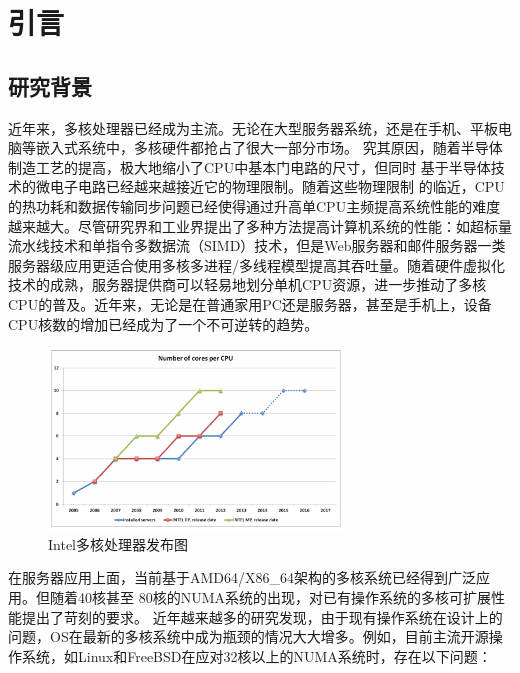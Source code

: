 

\chapter{引言}

\section{研究背景}

近年来，多核处理器已经成为主流。无论在大型服务器系统，还是在手机、平板电脑等嵌入式系统中，多核硬件都抢占了很大一部分市场。
究其原因，随着半导体制造工艺的提高，极大地缩小了CPU中基本门电路的尺寸，但同时
基于半导体技术的微电子电路已经越来越接近它的物理限制。随着这些物理限制
的临近，CPU的热功耗和数据传输同步问题已经使得通过升高单CPU主频提高系统性能的难度越来越大。尽管研究界和工业界提出了多种方法提高计算机系统的性能：如超标量流水线技术和单指令多数据流（SIMD）技术，但是Web服务器和邮件服务器一类服务器级应用更适合使用多核多进程/多线程模型提高其吞吐量。随着硬件虚拟化技术的成熟，服务器提供商可以轻易地划分单机CPU资源，进一步推动了多核CPU的普及。近年来，无论是在普通家用PC还是服务器，甚至是手机上，设备CPU核数的增加已经成为了一个不可逆转的趋势。

\begin{figure}[ht]
\begin{center}
\includegraphics[width=0.7\textwidth]{figures/intro_roadmap.png}
\end{center}
\caption{Intel多核处理器发布图\protect\footnotemark}
\label{fig:intro_roadmap}
\end{figure}
在服务器应用上面，当前基于AMD64/X86\_64架构的多核系统已经得到广泛应用。但随着40核甚至
80核的NUMA系统的出现，对已有操作系统的多核可扩展性能提出了苛刻的要求。
近年越来越多的研究发现\cite{radixvm:eurosys13}，由于现有操作系统在设计上的问题，OS在最新的多核系统中成为瓶颈的情况大大增多。例如，目前主流开源操作系统，如Linux和FreeBSD在应对32核以上的NUMA系统时，存在以下问题：

